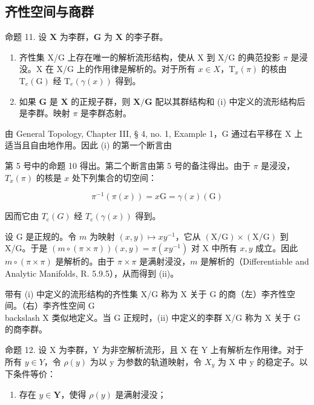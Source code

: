 \subsection{齐性空间与商群}

命题 11. 设 \(\mathbf{X}\) 为李群，\(\mathbf{G}\) 为 \(\mathbf{X}\) 的李子群。

\begin{enumerate}
\def\labelenumi{(\roman{enumi})}
\item
  齐性集 X/G 上存在唯一的解析流形结构，使从 X 到 X/G 的典范投影 \(\pi\) 是浸没。X 在 X/G 上的作用律是解析的。对于所有 \(x \in X\)，\(\mathrm{T}_{x}(\pi)\) 的核由 \(\mathrm{T}_{e}(\mathrm{G})\) 经 \(\mathrm{T}_{e}(\gamma(x))\) 得到。
\item
  如果 \(\mathbf{G}\) 是 \(\mathbf{X}\) 的正规子群，则 \(\mathbf{X} / \mathbf{G}\) 配以其群结构和 (i) 中定义的流形结构后是李群。映射 \(\pi\) 是李群态射。
\end{enumerate}

由 General Topology, Chapter III, § 4, no. 1, Example 1，G 通过右平移在 X 上适当且自由地作用。因此 (i) 的第一个断言由

第 5 号中的命题 10 得出。第二个断言由第 5 号的备注得出。由于 \(\pi\) 是浸没，\(T_{x}(\pi)\) 的核是 \(x\) 处下列集合的切空间：

\[
\pi^ {- 1} (\pi (x)) = x \mathrm{G} = \gamma (x) (\mathrm{G})
\]

因而它由 \(T_{e}(G)\) 经 \(T_{e}(\gamma(x))\) 得到。

设 G 是正规的。令 \(m\) 为映射 \((x,y)\mapsto xy^{-1}\)，它从 \((\mathrm{X / G})\times (\mathrm{X / G})\) 到 X/G。于是 \((m\circ (\pi \times \pi))(x,y) = \pi (xy^{-1})\) 对 X 中所有 \(x,y\) 成立。因此 \(m\circ (\pi \times \pi)\) 是解析的。由于 \(\pi \times \pi\) 是满射浸没，\(m\) 是解析的（Differentiable and Analytic Manifolds, R. 5.9.5），从而得到 (ii)。

带有 (i) 中定义的流形结构的齐性集 X/G 称为 X 关于 G 的商（左）李齐性空间。（右）李齐性空间 G\\backslash X 类似地定义。当 G 正规时，(ii) 中定义的李群 X/G 称为 X 关于 G 的商李群。

命题 12. 设 X 为李群，Y 为非空解析流形，且 X 在 Y 上有解析左作用律。对于所有 \(y \in Y\)，令 \(\rho(y)\) 为以 y 为参数的轨道映射，令 \(X_{y}\) 为 X 中 y 的稳定子。以下条件等价：

\begin{enumerate}
\def\labelenumi{(\roman{enumi})}
\tightlist
\item
  存在 \(y \in \mathbf{Y}\)，使得 \(\rho(y)\) 是满射浸没；
\end{enumerate}

